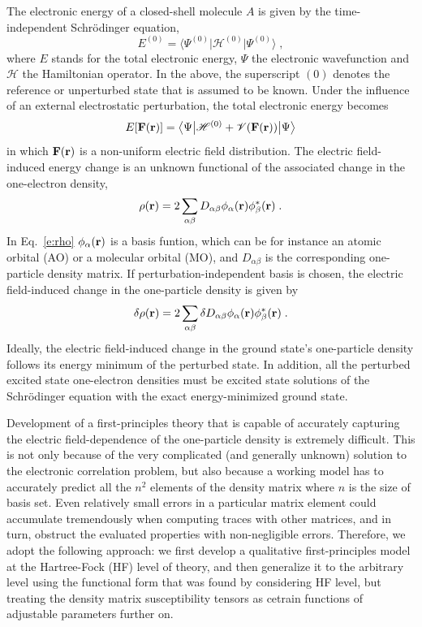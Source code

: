 \documentclass[aip,amsmath,amssymb,reprint]{revtex4-1}
\newcommand{\tbraket}[3]{\ensuremath{\bigl\langle {#1} \bigl\lvert {#2} \bigl\lvert {#3} \bigr\rangle}}
\begin{document}
The electronic energy of a closed\hyp{}shell molecule $A$ is given by the time\hyp{}independent Schr{\"o}dinger equation,
%
\begin{equation}
 E^{(0)} = \tbraket{\Psi^{(0)}}{\mathscr{H}^{(0)}}{\Psi^{(0)}} \;,
\end{equation}
%
where $E$ stands for the total electronic energy, $\Psi$ the electronic wavefunction and $\mathscr{H}$
the Hamiltonian operator. In the above, the superscript $(0)$
denotes the reference or unperturbed state that is assumed to be known.
Under the influence of an external electrostatic perturbation, the total electronic energy
becomes
%
\begin{equation}
 E[{\bf F}({\bf r})] = \tbraket{\Psi}{\mathscr{H}^{(0)} + \mathscr{V}({\bf F}({\bf r}))}{\Psi}
\end{equation}
%
in which ${\bf F}({\bf r})$ is a non\hyp{}uniform electric field distribution.
The electric field\hyp{}induced energy change is an unknown functional 
of the associated change in the one\hyp{}electron density,
%
\begin{equation}\label{e:rho}
 \rho({\bf r}) = 2\sum_{\alpha\beta} D_{\alpha\beta} \phi_\alpha({\bf r}) \phi^*_\beta({\bf r}) \;.
\end{equation}
%
In Eq.~\eqref{e:rho} $\phi_\alpha({\bf r})$ is a basis funtion, which can be for instance 
an atomic orbital (AO) or a molecular orbital (MO), and $D_{\alpha\beta}$ is the corresponding
one\hyp{}particle density matrix.
If perturbation\hyp{}independent basis is chosen, the electric field\hyp{}induced change in the one\hyp{}particle density
is given by
%
\begin{equation}\label{e:rho-1}
 \delta \rho({\bf r}) = 2\sum_{\alpha\beta} \delta D_{\alpha\beta} \phi_\alpha({\bf r}) \phi^*_\beta({\bf r}) \;.
\end{equation}
%
Ideally, the electric field\hyp{}induced change in the ground state's one\hyp{}particle density 
follows its energy minimum of the perturbed state. In addition, all the perturbed 
excited state one\hyp{}electron densities must be excited state solutions of the Schr{\"o}dinger equation
with the exact energy\hyp{}minimized ground state. 

Development of a first\hyp{}principles theory
that is capable of accurately capturing the electric field\hyp{}dependence of the one\hyp{}particle density
is extremely difficult. This is not only because of the very complicated (and generally unknown) solution
to the electronic correlation problem, but also because
a working model has to accurately predict all the $n^2$ elements of the density matrix
where $n$ is the size of basis set. Even relatively small errors
in a particular matrix element could accumulate tremendously when computing traces with other matrices,
and in turn, obstruct the evaluated properties with non\hyp{}negligible errors.
Therefore, we adopt the following approach: we first develop a qualitative first\hyp{}principles model 
at the Hartree\hyp{}Fock (HF)
level of theory, and then generalize it to the arbitrary level using the functional form that was found 
by considering HF level,
but treating the density matrix susceptibility tensors as cetrain functions of adjustable parameters further on.
\end{document}
